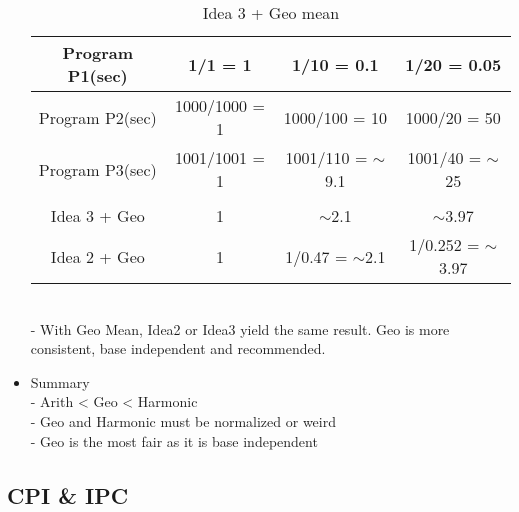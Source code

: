 \documentclass[12pt]{article}
\begin{document}
\begin{itemize}
\begin{table}[]
\begin{tabular}{cccc}
\multicolumn{1}{|c|}{Program P1(sec)} & \multicolumn{1}{c|}{1/1 = 1}       & \multicolumn{1}{c|}{1/10 = 0.1}           & \multicolumn{1}{c|}{1/20 = 0.05}          \\ \hline
\multicolumn{1}{|c|}{Program P2(sec)} & \multicolumn{1}{c|}{1000/1000 = 1} & \multicolumn{1}{c|}{1000/100 = 10}        & \multicolumn{1}{c|}{1000/20 = 50}         \\ \hline
\multicolumn{1}{|c|}{Program P3(sec)} & \multicolumn{1}{c|}{1001/1001 = 1} & \multicolumn{1}{c|}{1001/110 = $\sim$9.1} & \multicolumn{1}{c|}{1001/40 = $\sim$25}   \\ \hline
                                      &                                    &                                           &                                           \\ \hline
\multicolumn{1}{|c|}{Idea 3 + Geo}    & \multicolumn{1}{c|}{1}             & \multicolumn{1}{c|}{$\sim$2.1}            & \multicolumn{1}{c|}{$\sim$3.97}           \\ \hline
\multicolumn{1}{|c|}{Idea 2 + Geo}    & \multicolumn{1}{c|}{1}             & \multicolumn{1}{c|}{1/0.47 = $\sim$2.1}   & \multicolumn{1}{c|}{1/0.252 = $\sim$3.97} \\ \hline
\end{tabular}
                        \caption{Idea 3 + Geo mean}
                        \label{tab:my_label}
                    \end{table}
                        \\- With Geo Mean, Idea2 or Idea3 yield the same result. Geo is more consistent, base independent and recommended.
                \item {Summary}
                    \\- Arith < Geo < Harmonic
                    \\- Geo and Harmonic must be normalized or weird
                    \\- Geo is the most fair as it is base independent
            \end{itemize}
        \subsection{CPI \& IPC}
\end{document}
